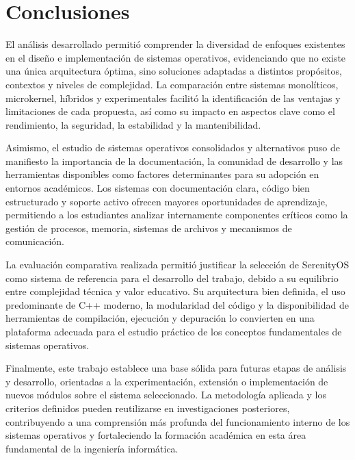 \section{Conclusiones}

El análisis desarrollado permitió comprender la diversidad de enfoques existentes en el diseño e implementación de sistemas operativos, evidenciando que no existe una única arquitectura óptima, sino soluciones adaptadas a distintos propósitos, contextos y niveles de complejidad. La comparación entre sistemas monolíticos, microkernel, híbridos y experimentales facilitó la identificación de las ventajas y limitaciones de cada propuesta, así como su impacto en aspectos clave como el rendimiento, la seguridad, la estabilidad y la mantenibilidad.

Asimismo, el estudio de sistemas operativos consolidados y alternativos puso de manifiesto la importancia de la documentación, la comunidad de desarrollo y las herramientas disponibles como factores determinantes para su adopción en entornos académicos. Los sistemas con documentación clara, código bien estructurado y soporte activo ofrecen mayores oportunidades de aprendizaje, permitiendo a los estudiantes analizar internamente componentes críticos como la gestión de procesos, memoria, sistemas de archivos y mecanismos de comunicación.

La evaluación comparativa realizada permitió justificar la selección de SerenityOS como sistema de referencia para el desarrollo del trabajo, debido a su equilibrio entre complejidad técnica y valor educativo. Su arquitectura bien definida, el uso predominante de C++ moderno, la modularidad del código y la disponibilidad de herramientas de compilación, ejecución y depuración lo convierten en una plataforma adecuada para el estudio práctico de los conceptos fundamentales de sistemas operativos.

Finalmente, este trabajo establece una base sólida para futuras etapas de análisis y desarrollo, orientadas a la experimentación, extensión o implementación de nuevos módulos sobre el sistema seleccionado. La metodología aplicada y los criterios definidos pueden reutilizarse en investigaciones posteriores, contribuyendo a una comprensión más profunda del funcionamiento interno de los sistemas operativos y fortaleciendo la formación académica en esta área fundamental de la ingeniería informática.
